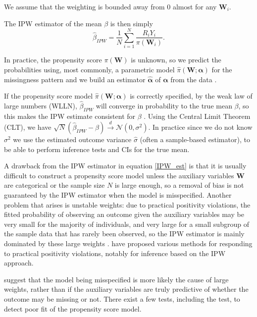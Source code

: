 \documentclass[12pt,twoside]{article}
\begin{document}
We assume that the weighting is bounded away from 0 almost for any $\mathbf{W}_i$.

The IPW estimator of the mean $\beta$ is then simply 
\begin{equation} \label{IPW_est}
    \hat{\beta}_{IPW} = \frac{1}{N} \sum_{i=1}^{N} \frac{R_iY_i}{\pi(\mathbf{W}_i)}.
\end{equation}

In practice, the propensity score $\pi(\mathbf{W})$ is unknown, so we predict the probabilities using, most commonly, a parametric model $\hat\pi(\mathbf{W}; \boldsymbol\alpha)$ for the missingness pattern and we build an estimator $\hat{\boldsymbol\alpha}$ of $\boldsymbol\alpha$ from the data \citep{vansteelandt}.

If the propensity score model $\hat\pi(\mathbf{W}; \boldsymbol\alpha)$ is correctly specified, by the weak law of large numbers (WLLN), $\hat{\beta}_{IPW}$ will converge in probability to the true mean $\beta$, so this makes the IPW estimate consistent for $\beta$ \citep{davidian}. Using the Central Limit Theorem (CLT), we have $\sqrt{N}(\hat{\beta}_{IPW}-\beta) \xrightarrow{d} \mathcal{N}(0,\sigma^2)$. In practice since we do not know $\sigma^2$ we use the estimated outcome variance $\hat\sigma$ (often a sample-based estimator), to be able to perform inference tests and CIs for the true mean.

A drawback from the IPW estimator in equation \ref{IPW_est} is that it is usually difficult to construct a propensity score model unless the auxiliary variables $\mathbf{W}$ are categorical or the sample size $N$ is large enough, so a removal of bias is not guaranteed by the IPW estimator when the model is misspecified. Another problem that arises is unstable weights: due to practical positivity violations, the fitted probability of observing an outcome given the auxiliary variables may be very small for the majority of individuals, and very large for a small subgroup of the sample data that has rarely been observed, so the IPW estimator is mainly dominated by these large weights \citep{seaman}. \cite{petersen} have proposed various methods for responding to practical positivity violations, notably for inference based on the IPW approach.

\citet{kang} suggest that the model being misspecified is more likely the cause of large weights, rather than if the auxiliary variables are truly predictive of whether the outcome may be missing or not. There exist a few tests, including the \citet{hosmer} test, to detect poor fit of the propensity score model.\\
\end{document}
